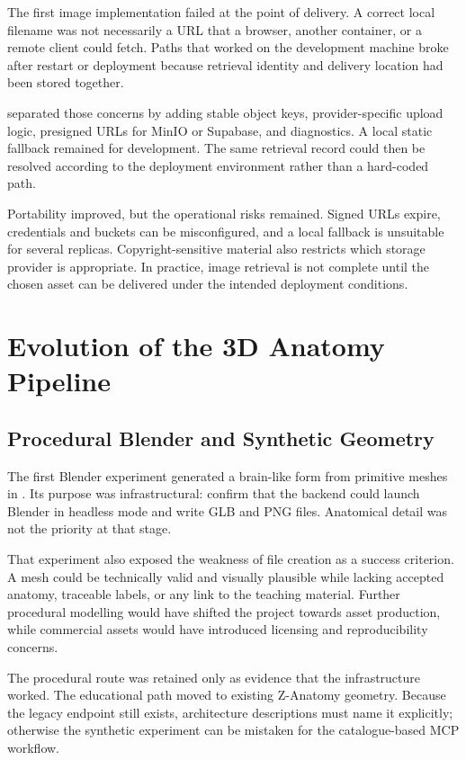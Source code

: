 The first image implementation failed at the point of delivery. A correct local filename was not necessarily a URL that a browser, another container, or a remote client could fetch. Paths that worked on the development machine broke after restart or deployment because retrieval identity and delivery location had been stored together.

 separated those concerns by adding stable object keys, provider-specific upload logic, presigned URLs for MinIO or Supabase, and diagnostics. A local static fallback remained for development. The same retrieval record could then be resolved according to the deployment environment rather than a hard-coded path.

Portability improved, but the operational risks remained. Signed URLs expire, credentials and buckets can be misconfigured, and a local fallback is unsuitable for several replicas. Copyright-sensitive material also restricts which storage provider is appropriate. In practice, image retrieval is not complete until the chosen asset can be delivered under the intended deployment conditions.

\section{Evolution of the 3D Anatomy Pipeline}
\label{sec:evolution-3d}

\subsection{Procedural Blender and Synthetic Geometry}
\label{sec:evolution-procedural-blender}

The first Blender experiment generated a brain-like form from primitive meshes in . Its purpose was infrastructural: confirm that the backend could launch Blender in headless mode and write GLB and PNG files. Anatomical detail was not the priority at that stage.

That experiment also exposed the weakness of file creation as a success criterion. A mesh could be technically valid and visually plausible while lacking accepted anatomy, traceable labels, or any link to the teaching material. Further procedural modelling would have shifted the project towards asset production, while commercial assets would have introduced licensing and reproducibility concerns.

The procedural route was retained only as evidence that the infrastructure worked. The educational path moved to existing Z-Anatomy geometry. Because the legacy endpoint still exists, architecture descriptions must name it explicitly; otherwise the synthetic experiment can be mistaken for the catalogue-based MCP workflow.

